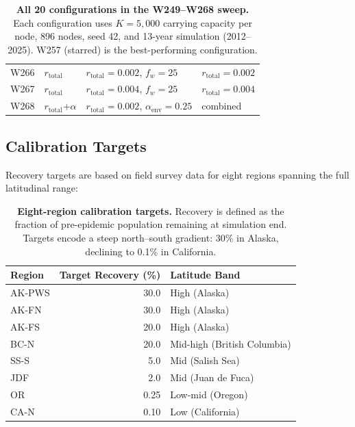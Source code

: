 \documentclass[11pt,a4paper,oneside]{article}
\begin{document}
\begin{table}[H]
\begin{tabular}{llll}
\rowcolor{lightgray}
W266 & $r_{\text{total}}$ & $r_{\text{total}} = 0.002$, $f_w = 25$ & $r_{\text{total}} = 0.002$ \\
W267 & $r_{\text{total}}$ & $r_{\text{total}} = 0.004$, $f_w = 25$ & $r_{\text{total}} = 0.004$ \\
\rowcolor{lightgray}
W268 & $r_{\text{total}}$+$\alpha$ & $r_{\text{total}} = 0.002$, $\alpha_{\text{env}} = 0.25$ & combined \\
\bottomrule
\end{tabular}
\caption{\textbf{All 20 configurations in the W249--W268 sweep.} Each configuration uses $K = 5{,}000$ carrying capacity per node, 896 nodes, seed 42, and 13-year simulation (2012--2025). W257 (starred) is the best-performing configuration.}
\label{tab:configs}
\end{table}

\subsection{Calibration Targets}

Recovery targets are based on field survey data for eight regions spanning the full latitudinal range:

\begin{table}[H]
\centering
\begin{tabular}{lrl}
\toprule
\textbf{Region} & \textbf{Target Recovery (\%)} & \textbf{Latitude Band} \\
\midrule
AK-PWS & 30.0 & High (Alaska) \\
AK-FN  & 30.0 & High (Alaska) \\
AK-FS  & 20.0 & High (Alaska) \\
BC-N   & 20.0 & Mid-high (British Columbia) \\
SS-S   &  5.0 & Mid (Salish Sea) \\
JDF    &  2.0 & Mid (Juan de Fuca) \\
OR     &  0.25 & Low-mid (Oregon) \\
CA-N   &  0.10 & Low (California) \\
\bottomrule
\end{tabular}
\caption{\textbf{Eight-region calibration targets.} Recovery is defined as the fraction of pre-epidemic population remaining at simulation end. Targets encode a steep north--south gradient: 30\% in Alaska, declining to 0.1\% in California.}
\label{tab:targets}
\end{table}

\clearpage
\end{document}
